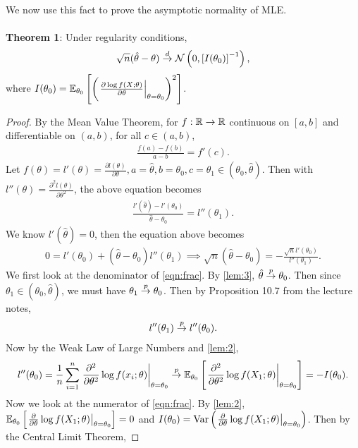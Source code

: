 $ $\\
We now use this fact to prove the asymptotic normality of MLE.\\\\
\textbf{Theorem 1}: Under regularity conditions, 
\begin{align*}
\sqrt{n}(\hat{\theta} - \theta) \overset{d}{\rightarrow} \mathcal{N}\left(0, \left[ I(\theta_0) \right]^{-1}\right),
\end{align*}
where $I(\theta_0) = \mathbb{E}_{\theta_0}\left[ \left( \left.\frac{\partial \log f(X;\theta)}{\partial\theta}\right\vert_{\theta=\theta_0} \right)^2 \right]$.
\begin{proof}
By the Mean Value Theorem, for $f:\mathbb{R} \rightarrow \mathbb{R}$ continuous on $[a,b]$ and differentiable on $(a,b)$, for all $c\in(a,b)$,
\begin{align*}
\frac{f(a)-f(b)}{a-b} = f'(c).
\end{align*}
Let $f(\theta) = l'(\theta) = \frac{\partial l(\theta)}{\partial \theta}, a=\hat{\theta}, b=\theta_0, c=\theta_1 \in (\theta_0, \hat{\theta})$. Then with $l''(\theta) = \frac{\partial^2 l(\theta)}{\partial \theta^2}$, the above equation becomes
\begin{align*}
\frac{l'(\hat{\theta}) - l'(\theta_0)}{\hat{\theta} - \theta_0} = l''(\theta_1).
\end{align*}
We know $l'(\hat{\theta}) = 0$, then the equation above becomes
\begin{align}
0 = l'(\theta_0) + (\hat{\theta} - \theta_0)l''(\theta_1) \implies \sqrt{n}(\hat{\theta} - \theta_0) = -\frac{\sqrt{n}l'(\theta_0)}{l''(\theta_1)}. \label{eqn:frac}
\end{align}
We first look at the denominator of \cref{eqn:frac}. By \cref{lem:3}, $\hat{\theta} \overset{p}{\rightarrow} \theta_0$. Then since $\theta_1\in(\theta_0, \hat{\theta})$, we must have $\theta_1 \overset{p}{\rightarrow} \theta_0$. Then by Proposition 10.7 from the lecture notes, 
\begin{align*}
l''(\theta_1) \overset{p}{\rightarrow} l''(\theta_0).
\end{align*}
Now by the Weak Law of Large Numbers and \cref{lem:2},
\begin{align}
l''(\theta_0) = \frac{1}{n}\sum_{i=1}^n \left.\frac{\partial^2}{\partial \theta^2}\log f(x_i; \theta)\right\vert_{\theta=\theta_0} \overset{p}{\rightarrow} \mathbb{E}_{\theta_0}\left[ \left.\frac{\partial^2}{\partial \theta^2}\log f(X_1; \theta)\right\vert_{\theta=\theta_0} \right] = -I(\theta_0). \label{eqn:denom}
\end{align}
Now we look at the numerator of \cref{eqn:frac}. By \cref{lem:2}, $\mathbb{E}_{\theta_0}\left[ \left.\frac{\partial}{\partial\theta}\log f(X_1;\theta)\right\vert_{\theta=\theta_0} \right] = 0$ and $I(\theta_0) = \text{Var}\left( \left.\frac{\partial}{\partial\theta}\log f(X_1;\theta)\right\vert_{\theta=\theta_0} \right)$. Then by the Central Limit Theorem,

\end{proof}
